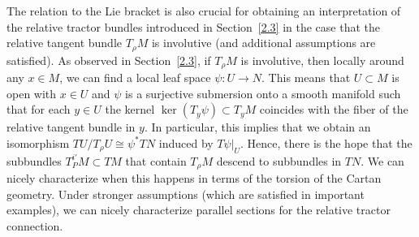 \documentclass[10pt,a4paper]{amsart}
\numberwithin{equation}{section}
\newcommand{\ps}{\psi}
\begin{document}
The relation to the Lie bracket is also crucial for obtaining an interpretation of
the relative tractor bundles introduced in Section~\ref{2.3} in the case that the relative
tangent bundle $T_\rho M$ is involutive (and additional assumptions are
satisfied). As observed in Section~\ref{2.3}, if $T_\rho M$ is involutive, then locally
around any $x\in M$, we can find a local leaf space $\psi\colon U\to N$. This means that
$U\subset M$ is open with $x\in U$ and $\ps$ is a surjective submersion onto a smooth
manifold such that for each $y\in U$ the kernel $\ker(T_y\psi)\subset T_y M$
coincides with the fiber of the relative tangent bundle in $y$. In particular, this
implies that we obtain an isomorphism $TU/T_\rho U\cong\psi^* TN$ induced by
$T\psi|_U$. Hence, there is the hope that the subbundles $T^{i'}_PM\subset TM$ that
contain $T_\rho M$ descend to subbundles in $TN$. We can nicely characterize when
this happens in terms of the torsion of the Cartan geometry. Under stronger
assumptions (which are satisfied in important examples), we can nicely characterize
parallel sections for the relative tractor connection.
\end{document}

